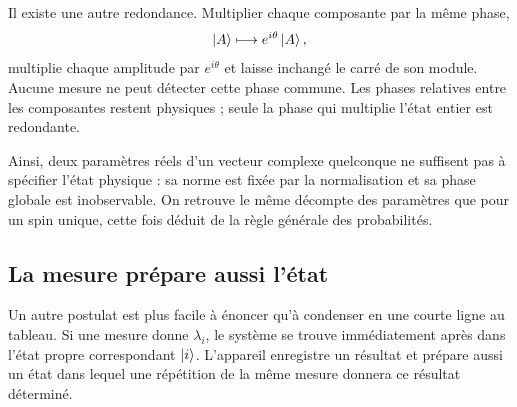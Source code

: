 \begin{classroomqa}\end{classroomqa}

Il existe une autre redondance. Multiplier chaque composante par la même phase,
\begin{equation}
\left\lvert A\right\rangle\longmapsto e^{i\theta}\left\lvert A\right\rangle,
\label{eq:l3-global-phase}
\end{equation}
multiplie chaque amplitude par \(e^{i\theta}\) et laisse inchangé le carré de son module. Aucune mesure ne peut détecter cette phase commune. Les phases relatives entre les composantes restent physiques ; seule la phase qui multiplie l’état entier est redondante.

Ainsi, deux paramètres réels d’un vecteur complexe quelconque ne suffisent pas à spécifier l’état physique : sa norme est fixée par la normalisation et sa phase globale est inobservable. On retrouve le même décompte des paramètres que pour un spin unique, cette fois déduit de la règle générale des probabilités.

\subsection{La mesure prépare aussi l’état}

Un autre postulat est plus facile à énoncer qu’à condenser en une courte ligne au tableau. Si une mesure donne \(\lambda_i\), le système se trouve immédiatement après dans l’état propre correspondant \(\left\lvert i\right\rangle\). L’appareil enregistre un résultat et prépare aussi un état dans lequel une répétition de la même mesure donnera ce résultat déterminé.

\begin{classroomqa}\end{classroomqa}

\begin{classroomqa}\end{classroomqa}

